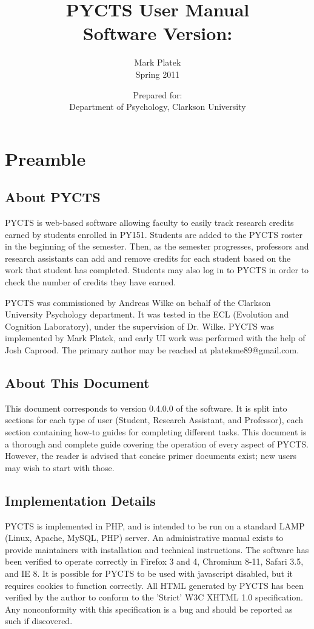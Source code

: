 \documentclass[letterpaper,titlepage]{article}
\title{ {\Huge {\bf PYCTS User Manual} } \\ {\Large Software Version: \softwareversion } }
\author{Mark Platek \\ Spring 2011}
\date{Prepared for: \\ Department of Psychology, Clarkson University}
\newcommand{\softwareversion}{0.4.0.0}
\begin{document}
\maketitle

\tableofcontents
\newpage


\section{Preamble}
\subsection{About PYCTS}
PYCTS is web-based software allowing faculty to easily track research credits earned by students enrolled in PY151. Students are added to the PYCTS roster in the beginning of the semester. Then, as the semester progresses, professors and research assistants can add and remove credits for each student based on the work that student has completed. Students may also log in to PYCTS in order to check the number of credits they have earned.

PYCTS was commissioned by Andreas Wilke on behalf of the Clarkson University Psychology department. It was tested in the ECL (Evolution and Cognition Laboratory), under the supervision of Dr. Wilke. PYCTS was implemented by Mark Platek, and early UI work was performed with the help of Josh Caprood. The primary author may be reached at platekme89@gmail.com.

\subsection{About This Document}
This document corresponds to version {\softwareversion} of the software. It is split into sections for each type of user (Student, Research Assistant, and Professor), each section containing how-to guides for completing different tasks. This document is a thorough and complete guide covering the operation of every aspect of PYCTS. However, the reader is advised that concise primer documents exist; new users may wish to start with those.

\subsection{Implementation Details}
PYCTS is implemented in PHP, and is intended to be run on a standard LAMP (Linux, Apache, MySQL, PHP) server. An administrative manual exists to provide maintainers with installation and technical instructions. The software has been verified to operate correctly in Firefox 3 and 4, Chromium 8-11, Safari 3.5, and IE 8. It is possible for PYCTS to be used with javascript disabled, but it requires cookies to function correctly. All HTML generated by PYCTS has been verified by the author to conform to the 'Strict' W3C XHTML 1.0 specification. Any nonconformity with this specification is a bug and should be reported as such if discovered.
\end{document}
